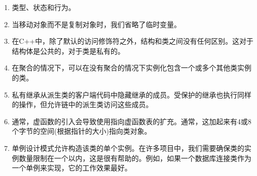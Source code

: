\begin{enumerate}
	\item 类型、状态和行为。
	\item 当移动对象而不是复制对象时，我们省略了临时变量。
	\item 在C++中，除了默认的访问修饰符之外，结构和类之间没有任何区别。这对于结构体是公共的，对于类是私有的。
	\item 在聚合的情况下，可以在没有聚合的情况下实例化包含一个或多个其他类实例的类。
	\item 私有继承从派生类的客户端代码中隐藏继承的成员。受保护的继承也执行同样的操作，但允许链中的派生类访问这些成员。
	\item 通常，虚函数的引入会导致使用指向虚函数表的扩充。通常，这加起来有4或8个字节的空间(根据指针的大小)指向类对象。
	\item 单例设计模式允许构造该类的单个实例。在许多项目中，我们需要确保类的实例数量限制在一个以内，这是很有帮助的。例如，如果一个数据库连接类作为一个单例来实现，它的工作效果最好。
\end{enumerate}












